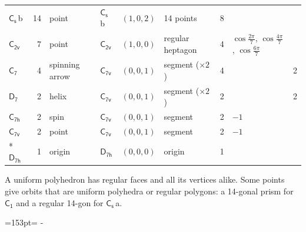 \documentclass[10pt,a4paper]{article}
\newcommand{\needspace}[1]{\par\penalty-100\begingroup\dimen0=#1\relax\dimen2=\pagegoal
  \advance\dimen2-\pagetotal\ifdim\dimen0>\dimen2\relax\ifdim\dimen2>0pt\vfil\break\fi\fi
  \endgroup}
\numberwithin{equation}{section}
\newcommand{\grp}[1]{\mathsf{#1}}
\newcommand{\clsletter}[1]{\,{\scriptsize\color{black!55}#1}}
\newlength{\fillwidth}\newlength{\cellwidth}\newlength{\colwidth}
\begin{document}
{{\begin{longtable}{@{}lrllllr>{\RaggedRight\arraybackslash}p{\fillwidth}r@{}}
\href{C1v.pdf}{$\grp{C_{s}}$}\clsletter{b} & 14 & point & \href{C1v.pdf}{$\grp{C_{s}}$}\clsletter{b} & $(1, 0, 2)$ & 14 points & 8 &  & \\
\href{C2v.pdf}{$\grp{C_{2v}}$} & 7 & point & \href{C2v.pdf}{$\grp{C_{2v}}$} & $(1, 0, 0)$ & regular heptagon & 4 & ${\cos\tfrac{2\pi}{7}}$, ${\cos\tfrac{4\pi}{7}}$, ${\cos\tfrac{6\pi}{7}}$ & \\
\href{C7.pdf}{$\grp{C_{7}}$} & 4 & spinning arrow & \href{C7v.pdf}{$\grp{C_{7v}}$} & $(0, 0, 1)$ & segment (${\times}2$) & 4 &  & 2\\
\href{D7.pdf}{$\grp{D_{7}}$} & 2 & helix & \href{C7v.pdf}{$\grp{C_{7v}}$} & $(0, 0, 1)$ & segment (${\times}2$) & 2 &  & 2\\
\href{C7h.pdf}{$\grp{C_{7h}}$} & 2 & spin & \href{C7v.pdf}{$\grp{C_{7v}}$} & $(0, 0, 1)$ & segment & 2 & ${-1}$ & \\
\href{C7v.pdf}{$\grp{C_{7v}}$} & 2 & point & \href{C7v.pdf}{$\grp{C_{7v}}$} & $(0, 0, 1)$ & segment & 2 & ${-1}$ & \\*
\href{D7h.pdf}{$\grp{D_{7h}}$} & 1 & origin & \href{D7h.pdf}{$\grp{D_{7h}}$} & $(0, 0, 0)$ & origin & 1 &  & \\
\bottomrule\end{longtable}}}
A uniform polyhedron has regular faces and all its vertices alike. Some points give orbits that are uniform polyhedra or regular polygons: a 14-gonal prism for \href{C1.pdf}{$\grp{C_{1}}$} and a regular 14-gon for \href{C1v.pdf}{$\grp{C_{s}}$}\clsletter{a}.
\needspace{153pt}
\end{document}
